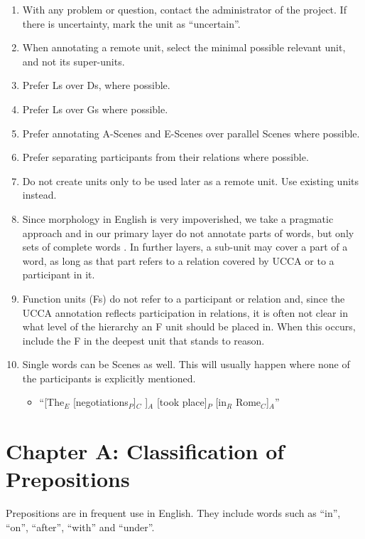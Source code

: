 \documentclass[11pt]{article}
\begin{document}
\begin{enumerate}
\item
With any problem or question, contact the administrator of the project. If there is uncertainty, mark the unit as ``uncertain''.
\item
When annotating a remote unit, select the minimal possible relevant unit, and not its super-units.
\item
Prefer Ls over Ds, where possible.
\item
Prefer Ls over Gs where possible.
\item
Prefer annotating A-Scenes and E-Scenes over parallel Scenes where possible.
\item
Prefer separating participants from their relations where possible.
\item
Do not create units only to be used later as a remote unit. Use existing units instead.
\item
Since morphology in English is very impoverished, we take a pragmatic approach and in our primary layer do not annotate parts of words, but only sets of complete words . In further layers, a sub-unit may cover a part of a word, as long as that part refers to a relation covered by UCCA or to a participant in it.
\item
Function units (Fs) do not refer to a participant or relation and, since the UCCA annotation reflects participation in relations, it is often not clear in what level of the hierarchy an F unit should be placed in. When this occurs, include the F in the deepest unit that stands to reason.
\item
Single words can be Scenes as well. This will usually happen where none of the participants is explicitly mentioned.
\begin{itemize}
\item
``[The$_E$ [negotiations$_P$]$_C$ ]$_A$ [took place]$_P$ [in$_R$ Rome$_C$]$_A$''
\end{itemize}


\end{enumerate}

\section{\large Chapter A: Classification of Prepositions}

Prepositions are in frequent use in English. They include words such as ``in'', ``on'', ``after'', ``with'' and ``under''.
\end{document}
